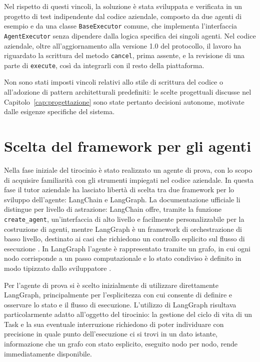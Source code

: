 Nel rispetto di questi vincoli, la soluzione è stata sviluppata e verificata in un progetto di test indipendente dal codice aziendale, composto da due agenti di esempio e da una classe \texttt{BaseExecutor} comune, che implementa l'interfaccia \texttt{AgentExecutor} senza dipendere dalla logica specifica dei singoli agenti. Nel codice aziendale, oltre all'aggiornamento alla versione 1.0 del protocollo, il lavoro ha riguardato la scrittura del metodo \texttt{cancel}, prima assente, e la revisione di una parte di \texttt{execute}, così da integrarli con il resto della piattaforma.

Non sono stati imposti vincoli relativi allo stile di scrittura del codice o all'adozione di pattern architetturali predefiniti: le scelte progettuali discusse nel Capitolo~\ref{cap:progettazione} sono state pertanto decisioni autonome, motivate dalle esigenze specifiche del sistema.

\section{Scelta del framework per gli agenti}
\label{sec:framework}

Nella fase iniziale del tirocinio è stato realizzato un agente di prova, con lo scopo di acquisire familiarità con gli strumenti impiegati nel codice aziendale. In questa fase il tutor aziendale ha lasciato libertà di scelta tra due framework per lo sviluppo dell'agente: LangChain e LangGraph. La documentazione ufficiale li distingue per livello di astrazione: LangChain offre, tramite la funzione \texttt{create\_agent}, un'interfaccia di alto livello e facilmente personalizzabile per la costruzione di agenti, mentre LangGraph è un framework di orchestrazione di basso livello, destinato ai casi che richiedono un controllo esplicito sul flusso di esecuzione \cite{langchainoverview}. In LangGraph l'agente è rappresentato tramite un grafo, in cui ogni nodo corrisponde a un passo computazionale e lo stato condiviso è definito in modo tipizzato dallo sviluppatore \cite{langgraphgithub}.

Per l'agente di prova si è scelto inizialmente di utilizzare direttamente LangGraph, principalmente per l'esplicitezza con cui consente di definire e osservare lo stato e il flusso di esecuzione. L'utilizzo di LangGraph risultava particolarmente adatto all'oggetto del tirocinio: la gestione del ciclo di vita di un Task e la sua eventuale interruzione richiedono di poter individuare con precisione in quale punto dell'esecuzione ci si trovi in un dato istante, informazione che un grafo con stato esplicito, eseguito nodo per nodo, rende immediatamente disponibile.

